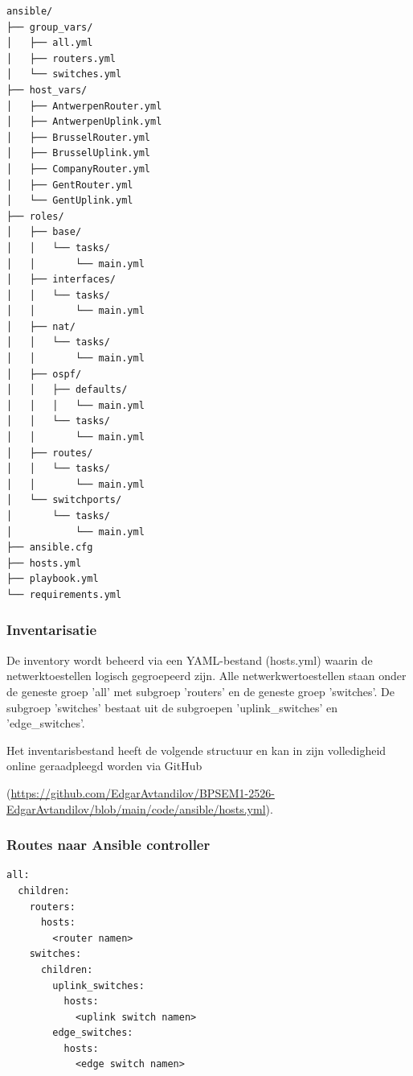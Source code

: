 \vspace{3em}

\begin{verbatim}
ansible/
├── group_vars/
│   ├── all.yml
│   ├── routers.yml
│   └── switches.yml
├── host_vars/
│   ├── AntwerpenRouter.yml
│   ├── AntwerpenUplink.yml
│   ├── BrusselRouter.yml
│   ├── BrusselUplink.yml
│   ├── CompanyRouter.yml
│   ├── GentRouter.yml
│   └── GentUplink.yml
├── roles/
│   ├── base/
│   │   └── tasks/
│   │       └── main.yml
│   ├── interfaces/
│   │   └── tasks/
│   │       └── main.yml
│   ├── nat/
│   │   └── tasks/
│   │       └── main.yml
│   ├── ospf/
│   │   ├── defaults/
│   │   │   └── main.yml
│   │   └── tasks/
│   │       └── main.yml
│   ├── routes/
│   │   └── tasks/
│   │       └── main.yml
│   └── switchports/
│       └── tasks/
│           └── main.yml
├── ansible.cfg
├── hosts.yml
├── playbook.yml
└── requirements.yml
\end{verbatim}

\subsubsection{Inventarisatie}
De inventory wordt beheerd via een YAML-bestand (hosts.yml) waarin de netwerktoestellen logisch gegroepeerd zijn.
Alle netwerkwertoestellen staan onder de geneste groep 'all' met subgroep 'routers' en de geneste groep 'switches'.
De subgroep 'switches' bestaat uit de subgroepen 'uplink\_switches' en 'edge\_switches'.

Het inventarisbestand heeft de volgende structuur en kan in zijn volledigheid online geraadpleegd worden via GitHub

(\url{https://github.com/EdgarAvtandilov/BPSEM1-2526-EdgarAvtandilov/blob/main/code/ansible/hosts.yml}).
\subsubsection{Routes naar Ansible controller}
\begin{listing}[H]
\caption{Structuur inventarisatie}
\label{lst:inventarisatie-structuur}
\begin{verbatim} 
all:
  children:
    routers:
      hosts:
        <router namen>
    switches:
      children:
        uplink_switches:
          hosts:
            <uplink switch namen>
        edge_switches:
          hosts:
            <edge switch namen>
\end{verbatim}
\end{listing}

